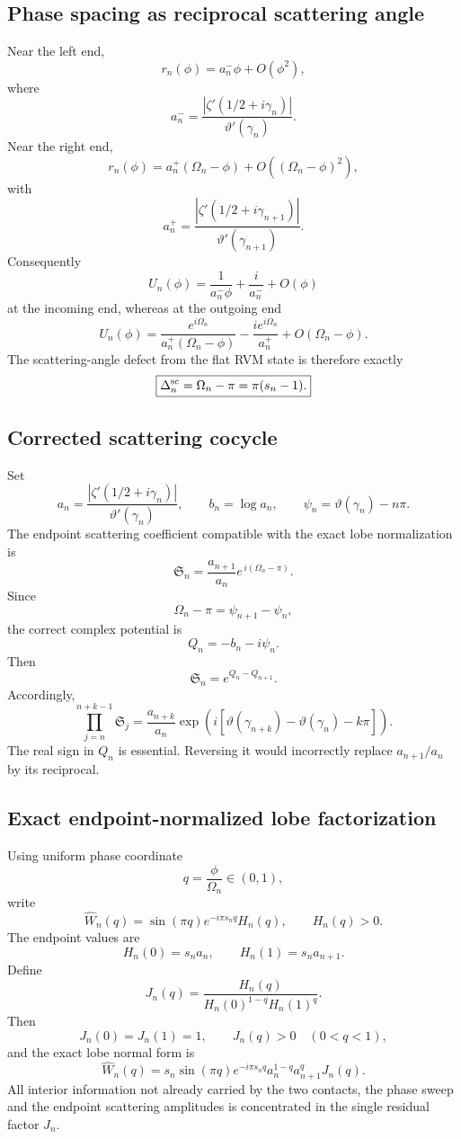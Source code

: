 \documentclass[11pt]{article}
\theoremstyle{definition}
\begin{document}
\subsection{Phase spacing as reciprocal scattering angle}

Near the left end,
\[
r_n(\phi)=a_n^-\phi+O(\phi^2),
\]
where
\[
a_n^-=
\frac{|\zeta'(1/2+i\gamma_n)|}{\vartheta'(\gamma_n)}.
\]
Near the right end,
\[
r_n(\phi)=a_n^+(\Omega_n-\phi)+O((\Omega_n-\phi)^2),
\]
with
\[
a_n^+=
\frac{|\zeta'(1/2+i\gamma_{n+1})|}
     {\vartheta'(\gamma_{n+1})}.
\]
Consequently
\[
U_n(\phi)
=
\frac1{a_n^-\phi}
+\frac{i}{a_n^-}+O(\phi)
\]
at the incoming end, whereas at the outgoing end
\[
U_n(\phi)
=
\frac{e^{i\Omega_n}}
     {a_n^+(\Omega_n-\phi)}
-\frac{i e^{i\Omega_n}}{a_n^+}
+O(\Omega_n-\phi).
\]
The scattering-angle defect from the flat RVM state is therefore exactly
\[
\boxed{
\Delta_n^{\rm sc}
=
\Omega_n-\pi
=
\pi(s_n-1).
}
\]

\subsection{Corrected scattering cocycle}

Set
\[
a_n=
\frac{|\zeta'(1/2+i\gamma_n)|}{\vartheta'(\gamma_n)},
\qquad
b_n=\log a_n,
\qquad
\psi_n=\vartheta(\gamma_n)-n\pi.
\]
The endpoint scattering coefficient compatible with the exact lobe
normalization is
\[
\boxed{
\mathfrak S_n
=
\frac{a_{n+1}}{a_n}
e^{\,i(\Omega_n-\pi)}.
}
\]
Since
\[
\Omega_n-\pi=\psi_{n+1}-\psi_n,
\]
the correct complex potential is
\[
\boxed{
Q_n=-b_n-i\psi_n.
}
\]
Then
\[
\boxed{
\mathfrak S_n=e^{Q_n-Q_{n+1}}.
}
\]
Accordingly,
\[
\boxed{
\prod_{j=n}^{n+k-1}\mathfrak S_j
=
\frac{a_{n+k}}{a_n}
\exp\!\left(
i[
\vartheta(\gamma_{n+k})-\vartheta(\gamma_n)-k\pi
]
\right).
}
\]
The real sign in $Q_n$ is essential.  Reversing it would incorrectly replace
$a_{n+1}/a_n$ by its reciprocal.

\subsection{Exact endpoint-normalized lobe factorization}

Using uniform phase coordinate
\[
q=\frac{\phi}{\Omega_n}\in(0,1),
\]
write
\[
\widehat W_n(q)
=
\sin(\pi q)e^{-i\pi s_nq}H_n(q),
\qquad
H_n(q)>0.
\]
The endpoint values are
\[
\boxed{
H_n(0)=s_na_n,
\qquad
H_n(1)=s_na_{n+1}.
}
\]
Define
\[
\boxed{
J_n(q)
=
\frac{H_n(q)}
     {H_n(0)^{1-q}H_n(1)^q}.
}
\]
Then
\[
J_n(0)=J_n(1)=1,
\qquad
J_n(q)>0\quad(0<q<1),
\]
and the exact lobe normal form is
\[
\boxed{
\widehat W_n(q)
=
s_n\sin(\pi q)e^{-i\pi s_nq}
a_n^{1-q}a_{n+1}^{q}J_n(q).
}
\]
All interior information not already carried by the two contacts, the phase
sweep and the endpoint scattering amplitudes is concentrated in the single
residual factor $J_n$.
\end{document}
